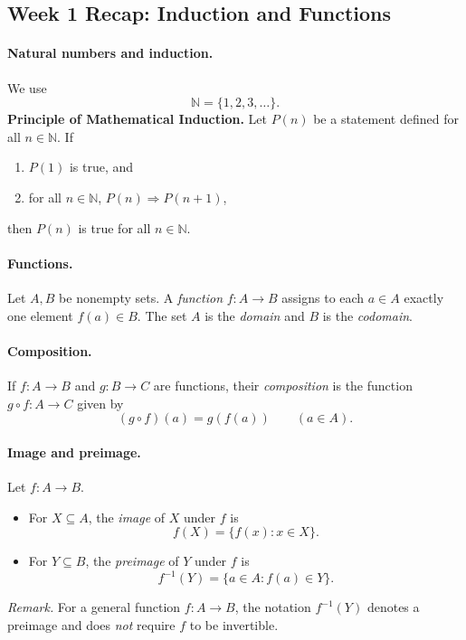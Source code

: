 \documentclass[12pt]{article}
\begin{document}
\subsection*{Week 1 Recap: Induction and Functions}

\paragraph{Natural numbers and induction.}
We use
\[
\mathbb{N} = \{1,2,3,\dots\}.
\]
\textbf{Principle of Mathematical Induction.} Let $P(n)$ be a statement defined for all $n\in\mathbb{N}$. If
\begin{enumerate}[label=\textbf{(\alph*)}]
  \item $P(1)$ is true, and
  \item for all $n\in\mathbb{N}$, $P(n)\Rightarrow P(n+1)$,
\end{enumerate}
then $P(n)$ is true for all $n\in\mathbb{N}$.

\paragraph{Functions.}
Let $A,B$ be nonempty sets. A \emph{function} $f:A\to B$ assigns to each $a\in A$ exactly one element $f(a)\in B$. The set $A$ is the \emph{domain} and $B$ is the \emph{codomain}.

\paragraph{Composition.}
If $f:A\to B$ and $g:B\to C$ are functions, their \emph{composition} is the function $g\circ f:A\to C$ given by
\[
(g\circ f)(a) = g(f(a)) \qquad (a\in A).
\]

\paragraph{Image and preimage.}
Let $f:A\to B$.
\begin{itemize}
  \item For $X\subseteq A$, the \emph{image} of $X$ under $f$ is
  \[
  f(X)=\{f(x):x\in X\}.
  \]
  \item For $Y\subseteq B$, the \emph{preimage} of $Y$ under $f$ is
  \[
  f^{-1}(Y)=\{a\in A: f(a)\in Y\}.
  \]
\end{itemize}
\emph{Remark.} For a general function $f:A\to B$, the notation $f^{-1}(Y)$ denotes a preimage and does \emph{not} require $f$ to be invertible.
\end{document}
